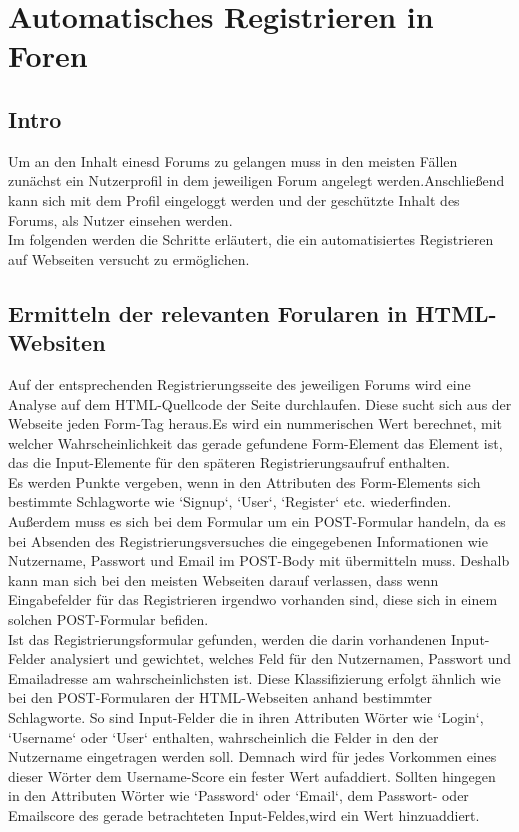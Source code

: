 \section {Automatisches Registrieren in Foren}
\subsection{Intro}
Um an den Inhalt einesd Forums zu gelangen muss in den meisten Fällen zunächst ein Nutzerprofil in dem jeweiligen Forum angelegt werden.Anschließend kann sich mit dem Profil eingeloggt werden und der geschützte Inhalt des Forums, als Nutzer einsehen werden. \\
Im folgenden werden die Schritte erläutert, die ein automatisiertes Registrieren auf Webseiten versucht zu ermöglichen.
\subsection{Ermitteln der relevanten Forularen in HTML-Websiten}
Auf der entsprechenden Registrierungsseite des jeweiligen Forums wird eine Analyse auf dem HTML-Quellcode der Seite durchlaufen.
Diese sucht sich aus der Webseite jeden Form-Tag heraus.Es wird ein nummerischen Wert berechnet, mit welcher Wahrscheinlichkeit das gerade gefundene Form-Element das Element ist, das die Input-Elemente für den späteren Registrierungsaufruf enthalten. \\
Es werden Punkte vergeben, wenn in den Attributen des Form-Elements sich bestimmte Schlagworte wie `Signup`, `User`, `Register` etc. wiederfinden. Außerdem muss es sich bei dem Formular um ein POST-Formular handeln, da es bei Absenden des Registrierungsversuches die eingegebenen Informationen wie Nutzername, Passwort und Email im POST-Body mit übermitteln muss.
Deshalb kann man sich bei den meisten Webseiten darauf verlassen, dass wenn Eingabefelder für das Registrieren irgendwo vorhanden sind, diese sich in einem solchen POST-Formular befiden.\\
Ist das Registrierungsformular gefunden, werden die darin vorhandenen Input-Felder analysiert und gewichtet, welches Feld für den Nutzernamen, Passwort und Emailadresse am wahrscheinlichsten ist.
Diese Klassifizierung erfolgt ähnlich wie bei den POST-Formularen der HTML-Webseiten anhand bestimmter Schlagworte.
So sind Input-Felder die in ihren Attributen Wörter wie `Login`, `Username` oder `User` enthalten, wahrscheinlich die Felder in den der Nutzername eingetragen werden soll. Demnach wird für jedes Vorkommen eines dieser Wörter dem Username-Score ein fester Wert aufaddiert. Sollten hingegen in den Attributen Wörter wie `Password` oder `Email`, dem Passwort- oder Emailscore des gerade betrachteten Input-Feldes,wird ein Wert hinzuaddiert.
